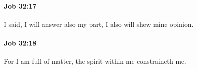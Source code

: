 		\paragraph{Job 32:17} %
			\label{JOB-32-17}

			I said, I will answer also my part, I also will shew mine opinion.


		\paragraph{Job 32:18} %
			\label{JOB-32-18}

			For I am full of matter, the spirit within me constraineth me.


